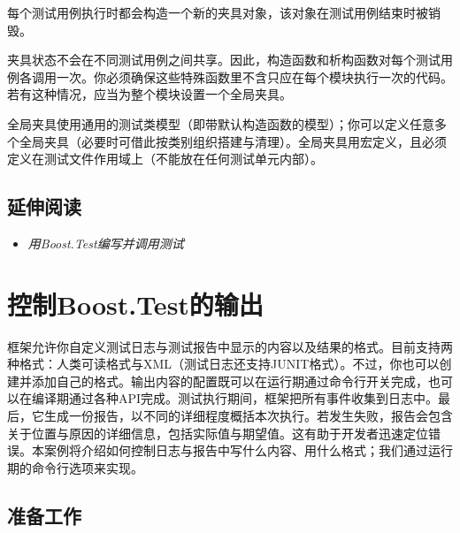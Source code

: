 
每个测试用例执行时都会构造一个新的夹具对象，该对象在测试用例结束时被销毁。



\begin{myNote}
夹具状态不会在不同测试用例之间共享。因此，构造函数和析构函数对每个测试用例各调用一次。你必须确保这些特殊函数里不含只应在每个模块执行一次的代码。若有这种情况，应当为整个模块设置一个全局夹具。
\end{myNote}



全局夹具使用通用的测试类模型（即带默认构造函数的模型）；你可以定义任意多个全局夹具（必要时可借此按类别组织搭建与清理）。全局夹具用宏定义，且必须定义在测试文件作用域上（不能放在任何测试单元内部）。



\subsection{延伸阅读}



\begin{itemize}
\item \textit{用Boost.Test编写并调用测试}

\end{itemize}



\section{控制Boost.Test的输出}



框架允许你自定义测试日志与测试报告中显示的内容以及结果的格式。目前支持两种格式：人类可读格式与XML（测试日志还支持JUNIT格式）。不过，你也可以创建并添加自己的格式。输出内容的配置既可以在运行期通过命令行开关完成，也可以在编译期通过各种API完成。测试执行期间，框架把所有事件收集到日志中。最后，它生成一份报告，以不同的详细程度概括本次执行。若发生失败，报告会包含关于位置与原因的详细信息，包括实际值与期望值。这有助于开发者迅速定位错误。本案例将介绍如何控制日志与报告中写什么内容、用什么格式；我们通过运行期的命令行选项来实现。



\subsection{准备工作}


